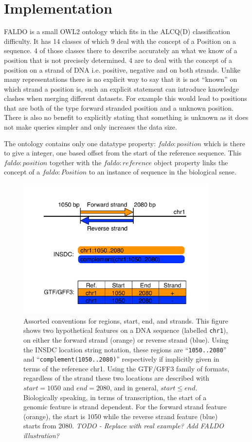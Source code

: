 \section*{Implementation}

FALDO is a small OWL2 ontology which fits in the ALCQ(D) classification difficulty.
It has 14 classes of which 9 deal with the concept of a Position on a sequence. 
4 of those classes there to describe accurately an what we know of a position that is not precisely determined. 
4 are to deal with the concept of a position on a strand of DNA i.e. positive, negative and on both strands.
Unlike many representations there is no explicit way to say that it is not ``known'' on which strand a position is,
such an explicit statement can introduce knowledge clashes when merging different datasets.
For example this would lead to positions that are both of the type forward stranded position and a unknown position.
There is also no benefit to explicitly stating that something is unknown as it does not make queries simpler and 
only increases the data size.

The ontology contains only one datatype property: $faldo:position$ which is there to give a integer, one based offset from 
the start of the reference sequence. This $faldo:position$ together with the $faldo:reference$ object property links the concept
of a $faldo:Position$ to an instance of sequence in the biological sense.

\begin{figure}[p]
\begin{center}
\includegraphics[width=10cm]{figures/figure-strand.pdf}
\end{center}
\caption{Assorted conventions for regions, start, end, and strands.
This figure shows two hypothetical features on a DNA sequence
(labelled \texttt{chr1}), on either the forward strand (orange) or
reverse strand (blue).
Using the INSDC location string notation, these regions are
``\texttt{1050..2080}'' and ``\texttt{complement(1050..2080)}''
respectively if implicitly given in terms of the reference chr1.
Using the GTF/GFF3 family of formats, regardless of the
strand these two locations are described with $start = 1050$
and $end = 2080$, and in general, $start \leq end$.
Biologically speaking, in terms of transcription, the start of a genomic
feature is strand dependent.
For the forward strand feature (orange), the start is 1050
while the reverse strand feature (blue) starts from 2080.
\textit{TODO - Replace with real example? Add FALDO illustration?}
}
\label{fig:strands}
\end{figure}

